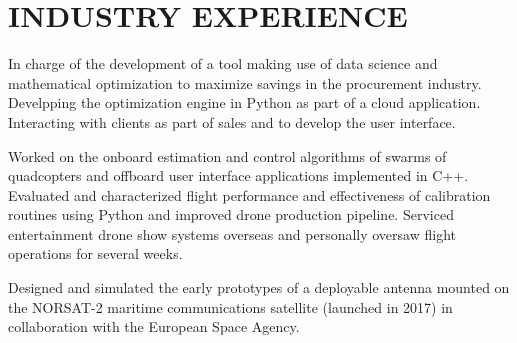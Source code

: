 \documentclass{ResumeTemplate}
\begin{document}
\begin{minipage}[c]{0.61\linewidth}

        \section{INDUSTRY EXPERIENCE}
        


        \workitemsthree
        {In charge of the development of a tool making use of data science and mathematical optimization to maximize savings in the procurement industry.}
        {Develpping the optimization engine in Python as part of a cloud application.}
        {Interacting with clients as part of sales and to develop the user interface.}
        

        \workitemsthree
        {Worked on the onboard estimation and control algorithms of swarms of quadcopters and offboard user interface applications implemented in C++.}
        {Evaluated and characterized flight performance and effectiveness of calibration routines using Python and improved drone production pipeline.}
        {Serviced entertainment drone show systems overseas and personally oversaw flight operations for several weeks.}


        \workitemsone
        {Designed and simulated the early prototypes of a deployable antenna mounted on the NORSAT-2 maritime communications satellite (launched in 2017) in collaboration with the European Space Agency.}


\end{minipage}
\end{document}

